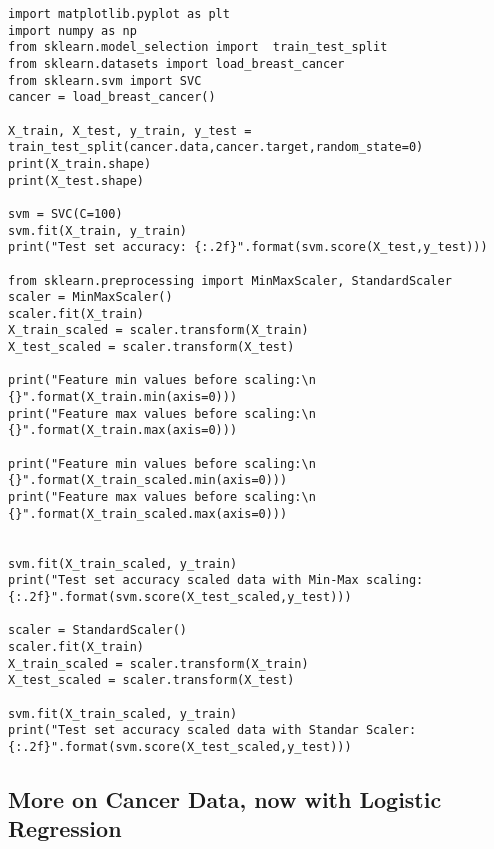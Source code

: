 \documentclass[%
oneside,                 %
final,                   %
10pt]{article}
\begin{document}
\begin{verbatim}
import matplotlib.pyplot as plt
import numpy as np
from sklearn.model_selection import  train_test_split 
from sklearn.datasets import load_breast_cancer
from sklearn.svm import SVC
cancer = load_breast_cancer()

X_train, X_test, y_train, y_test = train_test_split(cancer.data,cancer.target,random_state=0)
print(X_train.shape)
print(X_test.shape)

svm = SVC(C=100)
svm.fit(X_train, y_train)
print("Test set accuracy: {:.2f}".format(svm.score(X_test,y_test)))

from sklearn.preprocessing import MinMaxScaler, StandardScaler
scaler = MinMaxScaler()
scaler.fit(X_train)
X_train_scaled = scaler.transform(X_train)
X_test_scaled = scaler.transform(X_test)

print("Feature min values before scaling:\n {}".format(X_train.min(axis=0)))
print("Feature max values before scaling:\n {}".format(X_train.max(axis=0)))

print("Feature min values before scaling:\n {}".format(X_train_scaled.min(axis=0)))
print("Feature max values before scaling:\n {}".format(X_train_scaled.max(axis=0)))


svm.fit(X_train_scaled, y_train)
print("Test set accuracy scaled data with Min-Max scaling: {:.2f}".format(svm.score(X_test_scaled,y_test)))

scaler = StandardScaler()
scaler.fit(X_train)
X_train_scaled = scaler.transform(X_train)
X_test_scaled = scaler.transform(X_test)

svm.fit(X_train_scaled, y_train)
print("Test set accuracy scaled data with Standar Scaler: {:.2f}".format(svm.score(X_test_scaled,y_test)))

\end{verbatim}

\subsection*{More on Cancer Data, now with Logistic Regression}
\end{document}
